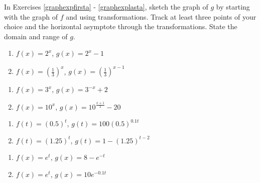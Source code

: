 \label{ExercisesforExponentialFunctions}

\label{IntroExpLogsExercises}

In Exercises \ref{graphexpfirsta} - \ref{graphexplasta}, sketch the graph of $g$ by starting with the graph of $f$ and using transformations.  Track at least three points of your choice and the horizontal asymptote through the transformations. State the domain and range of $g$.

\begin{multicols}{2}
\begin{enumerate}

\item  $f(x) = 2^{x}$, $g(x) = 2^{x} - 1$ \label{graphexpfirsta}

\item  $f(x) = \left(\frac{1}{3}\right)^{x}$, $g(x) = \left(\frac{1}{3}\right)^{x-1}$

\setcounter{HW}{\value{enumi}}
\end{enumerate}
\end{multicols}

\begin{multicols}{2}
\begin{enumerate}
\setcounter{enumi}{\value{HW}}

\item  $f(x) = 3^{x}$, $g(x) = 3^{-x}+2$

\item  $f(x) = 10^{x}$, $g(x) = 10^{\frac{x+1}{2}} - 20$  

\setcounter{HW}{\value{enumi}}
\end{enumerate}
\end{multicols}

\begin{multicols}{2}
\begin{enumerate}
\setcounter{enumi}{\value{HW}}

\item  $f(t) = (0.5)^{t}$, $g(t) = 100(0.5)^{0.1t}$

\item  $f(t) = (1.25)^{t}$, $g(t) = 1 - (1.25)^{t-2}$

\setcounter{HW}{\value{enumi}}
\end{enumerate}
\end{multicols}

\begin{multicols}{2}
\begin{enumerate}
\setcounter{enumi}{\value{HW}}

\item  $f(x) = e^{t}$, $g(x) = 8 - e^{-t}$

\item  $f(x) = e^{t}$, $g(x) = 10e^{-0.1t}$ \label{graphexplasta}

\setcounter{HW}{\value{enumi}}
\end{enumerate}
\end{multicols}

